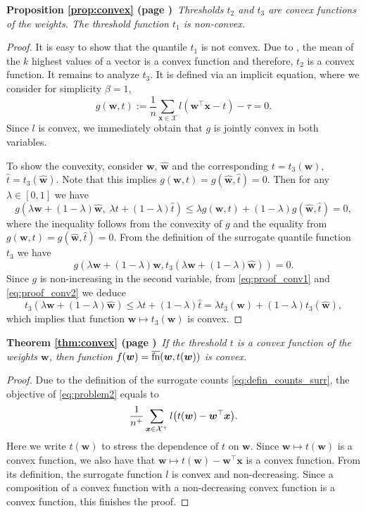 \documentclass[]{interact}
\theoremstyle{plain}%
\theoremstyle{definition}
\theoremstyle{remark}
\let\originalleft\left
\let\originalright\right
\renewcommand{\left}{\mathopen{}\mathclose\bgroup\originalleft}
\renewcommand{\right}{\aftergroup\egroup\originalright}
\newcommand{\fns}{\overline{\textnormal{fn}}}
\newcommand{\theoremNN}[2]{\noindent\textbf{Theorem \ref{#1} (page \pageref{#1})}\ \emph{#2}}
\newcommand{\propositionNN}[2]{\noindent\textbf{Proposition \ref{#1} (page \pageref{#1})}\ \emph{#2}}
\begin{document}
\propositionNN{prop:convex}{Thresholds $t_2$ and $t_3$ are convex functions of the weights. The threshold function $t_1$ is non-convex.}
\begin{proof}
  It is easy to show that the quantile $t_1$ is not convex. Due to \cite{lapin.2015}, the mean of the $k$ highest values of a vector is a convex function and therefore, $t_2$ is a convex function. It remains to analyze $t_3$. It is defined via an implicit equation, where we consider for simplicity $\beta=1$,
$$
g(\bm w,t):=\frac{1}{n}\sum_{\bm x\in\mathcal{X}} l(\bm w^\top \bm x-t) - \tau = 0.
$$
Since $l$ is convex, we immediately obtain that $g$ is jointly convex in both variables.

To show the convexity, consider $\bm w$, $\hat{\bm w}$ and the corresponding $t= t_3(\bm w)$, $\hat t=t_3(\hat{\bm w})$. Note that this implies $g(\bm w,t)=g(\hat{\bm w},\hat t)=0$. Then for any $\lambda\in[0,1]$ we have 
\begin{equation}\label{eq:proof_conv1}
g(\lambda\bm w+(1-\lambda)\hat{\bm w},\;\lambda t+(1-\lambda)\hat t) \le\lambda g(\bm w,t)+(1-\lambda)g(\hat{\bm w},\hat t)=0,
\end{equation}
where the inequality follows from the convexity of $g$ and the equality from $g(\bm w,t)=g(\hat{\bm w},\hat t)=0.$
From the definition of the surrogate quantile function $t_3$ we have
\begin{equation}\label{eq:proof_conv2}
g(\lambda\bm w+(1-\lambda)\hat{\bm w},t_3(\lambda\bm w+(1-\lambda)\hat{\bm w}))=0.
\end{equation}
Since $g$ is non-increasing in the second variable, from \eqref{eq:proof_conv1} and \eqref{eq:proof_conv2} we deduce
$$
t_3(\lambda\bm w+(1-\lambda)\hat{\bm w})\le\lambda t+(1-\lambda)\hat t =\lambda t_3(\bm w)+(1-\lambda) t_3(\hat{\bm w}),
$$
which implies that function $\bm w\mapsto t_3(\bm w)$ is convex.
\end{proof}




\theoremNN{thm:convex}{If the threshold $t$ is a convex function of the weights $\bm w$, then function $f(\bm w) = \fns(\bm w, t(\bm w))$ is convex.}
\begin{proof}
Due to the definition of the surrogate counts \eqref{eq:defin_counts_surr}, the objective of \eqref{eq:problem2} equals to
$$
\frac{1}{n^+}\sum_{\bm x\in\mathcal{X}^+} l\left(t(\bm w)-\bm w^\top \bm x\right).
$$
Here we write $t(\bm w)$ to stress the dependence of $t$ on $\bm w$. Since $\bm w\mapsto t(\bm w)$ is a convex function, we also have that $\bm w\mapsto t(\bm w)-\bm w^\top \bm x$ is a convex function. From its definition, the surrogate function $l$ is convex and non-decreasing. Since a composition of a convex function with a non-decreasing convex function is a convex function, this finishes the proof.
\end{proof}
\end{document}
